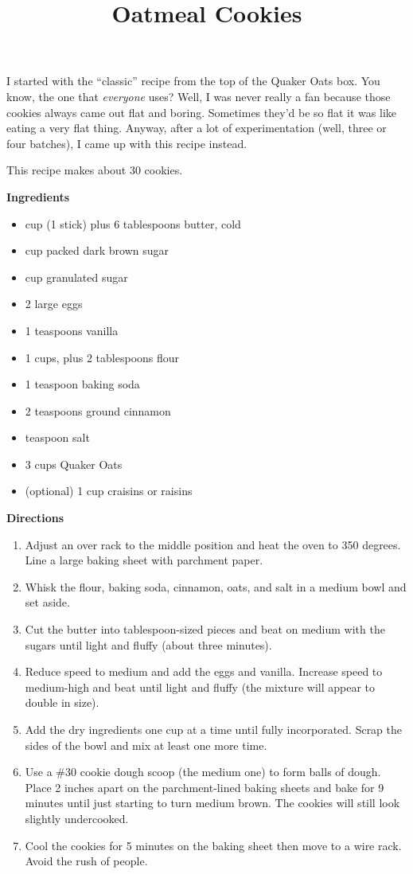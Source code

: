 \documentclass{article}
\title{Oatmeal Cookies}
\begin{document}
I started with the ``classic'' recipe from the top of the Quaker Oats box. You know,
the one that \emph{everyone} uses? Well, I was never really a fan because those
cookies always came out flat and boring. Sometimes they'd be so flat it was like
eating a very flat thing. Anyway, after a lot of experimentation (well, three or
four batches), I came up with this recipe instead.

This recipe makes about 30 cookies.

\bigskip

\textbf{Ingredients}

\begin{itemize}
      \item {} cup (1 stick) plus 6 tablespoons butter, cold
      \item {} cup packed dark brown sugar
      \item {} cup granulated sugar
      \item 2 large eggs
      \item 1 teaspoons vanilla
      \item 1 cups, plus 2 tablespoons flour
      \item 1 teaspoon baking soda
      \item 2 teaspoons ground cinnamon
      \item {} teaspoon salt
      \item 3 cups Quaker Oats
      \item (optional) 1 cup craisins or raisins
\end{itemize}

\bigskip

\textbf{Directions}

\begin{enumerate}
      \item Adjust an over rack to the middle position and heat the oven to 350 degrees. Line a large baking sheet
            with parchment paper.
      \item Whisk the flour, baking soda, cinnamon, oats, and salt in a medium bowl and set aside.
      \item Cut the butter into tablespoon-sized pieces and beat on medium with the sugars until light and fluffy
            (about three minutes).
      \item Reduce speed to medium and add the eggs and vanilla. Increase speed to medium-high and beat until
            light and fluffy (the mixture will appear to double in size).
      \item Add the dry ingredients one cup at a time until fully incorporated. Scrap the sides of the
            bowl and mix at least one more time.
      \item Use a \#30 cookie dough scoop (the medium one) to form balls of dough.
            Place 2 inches apart on the parchment-lined baking sheets and bake for 9 minutes until just starting
            to turn medium brown. The cookies will still look slightly undercooked.
      \item Cool the cookies for 5 minutes on the baking sheet then move to a wire rack. Avoid the rush of people.
\end{enumerate}
\end{document}

